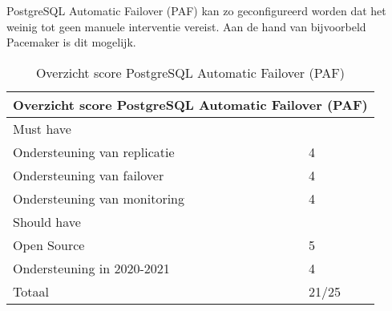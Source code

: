 PostgreSQL Automatic Failover (PAF) kan zo geconfigureerd worden dat het weinig tot geen manuele interventie vereist. Aan de hand van bijvoorbeld Pacemaker is dit mogelijk.



\begin{table}[!h]
    \centering
    \begin{tabular}{ |p{6cm}||p{6cm}|  }
        \hline
        \multicolumn{2}{|c|}{Overzicht score PostgreSQL Automatic Failover (PAF)} \\
        \hline
        Must have & \\
        \hline
        Ondersteuning van replicatie  & 4 \\
        Ondersteuning van failover &  4 \\
        Ondersteuning van monitoring & 4 \\
        \hline
        Should have & \\
        \hline
        Open Source &  5 \\
        Ondersteuning in 2020-2021 & 4 \\
        \hline
        \hline
        Totaal & 21/25 \\
        \hline    
    \end{tabular}
    \caption{Overzicht score PostgreSQL Automatic Failover (PAF)}
    \label{table:Overzicht score PostgreSQL Automatic Failover (PAF)}
\end{table}
